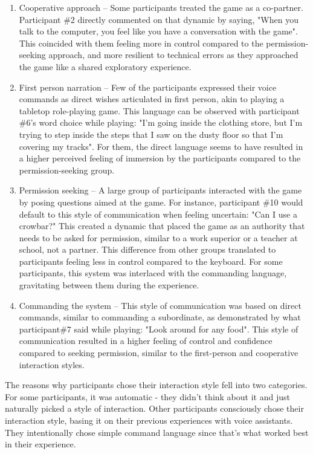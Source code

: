 \begin{enumerate}
    \item Cooperative approach -- Some participants treated the game as a co-partner. 
    Participant \#2 directly commented on that dynamic by saying, "When you talk to the computer, you feel like you have a conversation with the game".
    This coincided with them feeling more in control compared to the permission-seeking approach, and more resilient to technical errors as they approached the game like a shared exploratory experience. 

    \item First person narration -- Few of the participants expressed their voice commands as direct wishes articulated in first person, akin to playing a tabletop role-playing game. This language can be observed with participant \#6's word choice while playing: "I'm going inside the clothing store, but I'm trying to step inside the steps that I saw on the dusty floor so that I'm covering my tracks". For them, the direct language seems to have resulted in a higher perceived feeling of immersion by the participants compared to the permission-seeking group. 
    
    \item Permission seeking -- A large group of participants interacted with the game by posing questions aimed at the game. For instance, participant \#10 would default to this style of communication when feeling uncertain: "Can I use a crowbar?" This created a dynamic that placed the game as an authority that needs to be asked for permission, similar to a work superior or a teacher at school, not a partner.
    This difference from other groups translated to participants feeling less in control compared to the keyboard.
    For some participants, this system was interlaced with the commanding language, gravitating between them during the experience.

    \item Commanding the system -- This style of communication was based on direct commands, similar to commanding a subordinate, as demonstrated by what participant\#7 said while playing: "Look around for any food". This style of communication resulted in a higher feeling of control and confidence compared to seeking permission, similar to the first-person and cooperative interaction styles.
    
\end{enumerate}

The reasons why participants chose their interaction style fell into two categories. 
For some participants, it was automatic - they didn't think about it and just naturally picked a style of interaction. 
Other participants consciously chose their interaction style, basing it on their previous experiences with voice assistants. They intentionally chose simple command language since that's what worked best in their experience. 

